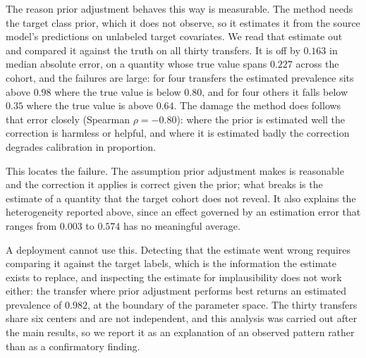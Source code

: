 
The reason prior adjustment behaves this way is measurable. The method needs the
target class prior, which it does not observe, so it estimates it from the
source model's predictions on unlabeled target covariates. We read that estimate
out and compared it against the truth on all thirty transfers. It is off by
$0.163$ in median absolute error, on a quantity whose true value spans $0.227$
across the cohort, and the failures are large: for four transfers the estimated
prevalence sits above $0.98$ where the true value is below $0.80$, and for four
others it falls below $0.35$ where the true value is above $0.64$. The damage
the method does follows that error closely (Spearman $\rho=-0.80$): where the
prior is estimated well the correction is harmless or helpful, and where it is
estimated badly the correction degrades calibration in proportion.

This locates the failure. The assumption prior adjustment makes is reasonable
and the correction it applies is correct given the prior; what breaks is the
estimate of a quantity that the target cohort does not reveal. It also explains
the heterogeneity reported above, since an effect governed by an estimation
error that ranges from $0.003$ to $0.574$ has no meaningful average.

A deployment cannot use this. Detecting that the estimate went wrong requires
comparing it against the target labels, which is the information the estimate
exists to replace, and inspecting the estimate for implausibility does not work
either: the transfer where prior adjustment performs best returns an estimated
prevalence of $0.982$, at the boundary of the parameter space. The thirty
transfers share six centers and are not independent, and this analysis was
carried out after the main results, so we report it as an explanation of an
observed pattern rather than as a confirmatory finding.
